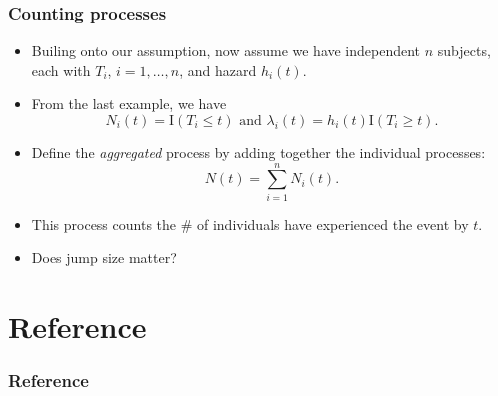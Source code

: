 \documentclass[10pt]{beamer}\usepackage[]{graphicx}\usepackage[]{color}
\newcommand{\I}{\mathrm{I}}
\begin{document}
\begin{frame}
  \frametitle{Counting processes}
  \begin{itemize}  
  \item Builing onto our assumption, now assume we have independent $n$ subjects, 
    each with $T_i$, $i = 1, \ldots, n$, and hazard $h_i(t)$.
  \item From the last example, we have 
    $$N_i(t) = \I(T_i\le t) \mbox{ and }\lambda_i(t) = h_i(t) \I(T_i\ge t).$$
  \item Define the \emph{aggregated} process by adding together the individual processes:
    $$N(t) = \sum_{i = 1}^nN_i(t).$$
  \item This process counts the \# of individuals have experienced the event by $t$.
  \item Does jump size matter?
  \end{itemize}
\end{frame} 

    

\section{Reference}
\begin{frame}[shrink = 25]
\frametitle{Reference}
\begin{center}
\scriptsize


\end{center}
\end{frame}
\end{document}
